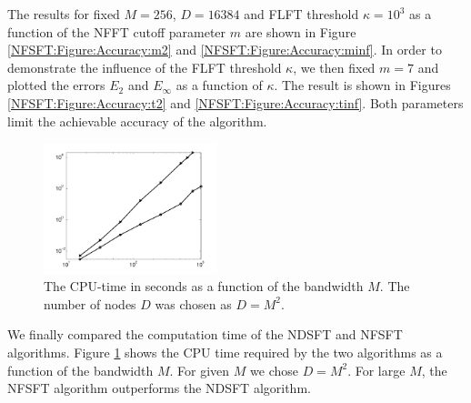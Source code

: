 The results for fixed $M = 256$, $D = 16384$ and FLFT threshold 
$\kappa=10^3$ as a function of the NFFT cutoff parameter $m$ 
are shown in Figure \ref{NFSFT:Figure:Accuracy:m2} and 
\ref{NFSFT:Figure:Accuracy:minf}. In order to 
demonstrate the influence of the FLFT threshold $\kappa$, we then fixed 
$m=7$ and plotted the errors $E_{2}$ and $E_{\infty}$ as a function
of $\kappa$. The result is shown in Figures \ref{NFSFT:Figure:Accuracy:t2}
and \ref{NFSFT:Figure:Accuracy:tinf}. Both parameters limit 
the achievable accuracy of the algorithm.

\begin{figure}[tb]
  \centering
  \includegraphics[width=0.45\textwidth]{images/timing}
  \caption{The CPU-time in seconds as a function of the bandwidth $M$. 
  The number of nodes $D$ was chosen as $D=M^2$.}
  \label{NFSFT:Figure:Timing}
\end{figure}

We finally compared the computation time of the NDSFT and NFSFT algorithms.
Figure \ref{NFSFT:Figure:Timing} shows the CPU time required by the two
algorithms as a
function of the bandwidth $M$. For given $M$ we chose $D=M^2$. For large 
$M$, the NFSFT algorithm outperforms the NDSFT algorithm.

